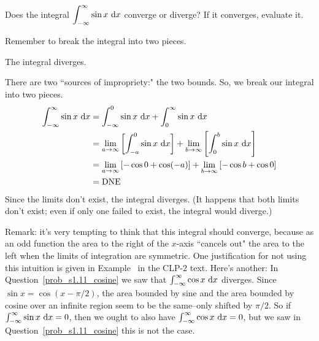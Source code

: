 \begin{Mquestion}\label{prob_s1.11_sine}
Does the integral $\displaystyle\int_{-\infty}^\infty \sin x~\mathrm{d}x$ converge or diverge?
 If it converges, evaluate it.
\end{Mquestion}
\begin{hint}
Remember to break the integral into two pieces.
\end{hint}
\begin{answer}
The integral diverges.
\end{answer}
\begin{solution}
There are two ``sources of impropriety:" the two bounds. So, we break our integral into two pieces.
\begin{align*}
\int_{-\infty}^\infty \sin x~\mathrm{d}x&=\int_{-\infty}^0 \sin x~\mathrm{d}x+\int_{0}^\infty \sin x~\mathrm{d}x\\
&=\lim_{a \to \infty }\left[\int_{-a}^0 \sin x~\mathrm{d}x\right]+
\lim_{b \to \infty }\left[\int_{0}^b \sin x~\mathrm{d}x\right]\\
&=\lim_{a \to \infty }\left[-\cos 0 + \cos(- a)
\right]+
\lim_{b \to \infty }\left[-\cos b + \cos 0
\right]\\
&=\text{DNE}
\end{align*}
Since the limits don't exist, the integral diverges. (It happens that both limits don't exist; even if only one failed to exist, the integral would diverge.)

Remark: it's very tempting to think that this integral should converge, because as an odd function the area to the right of the $x$-axis ``cancels out" the area to the left when the limits of integration are symmetric. One justification for not using this intuition is given in Example~ in the CLP-2 text. Here's another:
In Question~\ref{prob_s1.11_cosine} we saw that $\int_{-\infty}^\infty \cos x~\mathrm{d}x$ diverges. Since $\sin x = \cos (x-\pi/2)$, the area bounded by sine and the area bounded by cosine over an infinite region seem to be the same--only shifted by $\pi/2$. So if $\int_{-\infty}^\infty \sin x~\mathrm{d}x=0$, then we ought to also have $\int_{-\infty}^\infty \cos x~\mathrm{d}x=0$, but we saw in Question~\ref{prob_s1.11_cosine} this is not the case.

\begin{center}
\end{center}
\end{solution}

